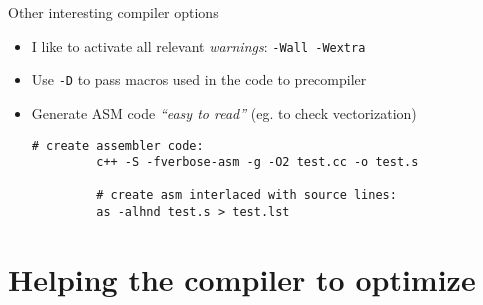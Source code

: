 \documentclass[10pt,xcolor=table]{beamer}
\begin{document}
\begin{frame}[fragile]{Other interesting compiler options}

  \begin{itemize}
  \item I like to activate all relevant \emph{warnings}: {\tt -Wall
      -Wextra}
  \item Use {\tt -D} to pass macros used in the code to precompiler

    \pause

  \item Generate ASM code \emph{``easy to read''} (eg. to check
    vectorization)
        \begin{lstlisting}[style=shell,gobble=5,caption={From the book
\emph{Algorithms for programmers}\footnote<2>{Algorithm for programmers:
\url{https://www.jjj.de/fxt/fxtbook.pdf}}\footnote<2>{Generating Mixed
Source and Assembly List using GCC: {\scriptsize \url{http://www.systutorials.com/240/generate-a-mixed-source-and-assembly-listing-using-gcc}}}}]
         # create assembler code:
         c++ -S -fverbose-asm -g -O2 test.cc -o test.s

         # create asm interlaced with source lines:
         as -alhnd test.s > test.lst
       \end{lstlisting}
  \end{itemize}

\end{frame}


\section{Helping the compiler to optimize}
\end{document}
